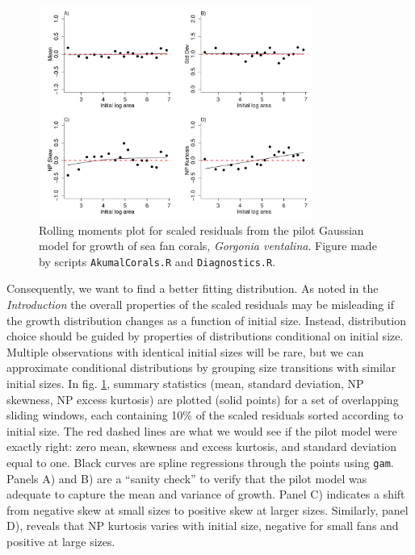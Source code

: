 \documentclass[11pt]{article}
\begin{document}
{\begin{figure}[tbp]
\centering
\includegraphics[width=0.8\textwidth]{figures/AkumalRollingResiduals.pdf}
\caption{Rolling moments plot for scaled residuals from the pilot Gaussian model for growth of sea fan corals, \emph{Gorgonia ventalina}. 
Figure made by scripts \texttt{AkumalCorals.R} and \texttt{Diagnostics.R}.}
\label{fig:AkumalRollingResiduals}
\end{figure} 

Consequently, we want to find a better fitting distribution. As noted in the \emph{Introduction} the overall properties of the scaled 
residuals may be misleading if the growth distribution changes as a function of initial size. 
Instead, distribution choice should be guided by properties of distributions conditional on initial size. 
Multiple observations with identical initial sizes will be rare, but we can 
approximate conditional distributions by grouping size transitions with similar initial sizes. 
In fig. \ref{fig:AkumalRollingResiduals}, summary statistics (mean, standard deviation, NP skewness, NP excess kurtosis) 
are plotted (solid points) for a set of overlapping sliding windows, each containing 10\% of the scaled residuals sorted according to initial size. 
The red dashed lines are what we would see if the pilot model were exactly right: zero mean, skewness and excess kurtosis, and 
standard deviation equal to one. Black curves are spline regressions through the points using \texttt{gam}. Panels A) and B) are a ``sanity check'' to verify
that the pilot model was adequate to capture the mean and variance of growth. Panel C) indicates a shift from negative
skew at small sizes to positive skew at larger sizes. Similarly, panel D), reveals that NP kurtosis varies with initial size, 
negative for small fans and positive at large sizes. 

}
\end{document}
